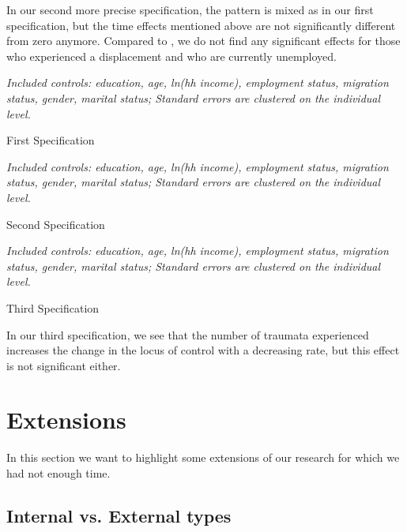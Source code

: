 \documentclass[12pt, a4paper, fleqn, parskip]{scrartcl}
\begin{document}
In our second more precise specification, the pattern is mixed as in our first
specification, but the time effects mentioned above are not significantly
different from zero anymore. Compared to \citet{preuss2017}, we do not find any
significant effects for those who experienced a displacement and who are
currently unemployed.

\begin{table}[H]
	\tiny{}
	\footnotesize \textit{Included controls: education, age, ln(hh income),
	employment status, migration status, gender, marital status; Standard
	errors are clustered on the individual level.}
	\caption{First Specification}
	\label{tab:first_reg}
\end{table}
\newpage


\begin{table}[H]
	\tiny{}
	\footnotesize \textit{Included controls: education, age, ln(hh income),
	employment status, migration status, gender, marital status; Standard
	errors are clustered on the individual level.}
	\caption{Second Specification}
	\label{tab:second_reg}
\end{table}
\newpage

\begin{table}[H]
	
	\footnotesize \textit{Included controls: education, age, ln(hh income),
	employment status, migration status, gender, marital status; Standard
	errors are clustered on the individual level.}
	\caption{Third Specification}
	\label{tab:third_reg}
\end{table}
\newpage

In our third specification, we see that the number of traumata experienced
increases the change in the locus of control with a decreasing rate, but this
effect is not significant either.


\section{Extensions} %
\label{sec:extensions}

In this section we want to highlight some extensions of our research for which
we had not enough time.

\subsection{Internal vs. External types} %
\label{sub:internal_vs_external_types}
\end{document}
